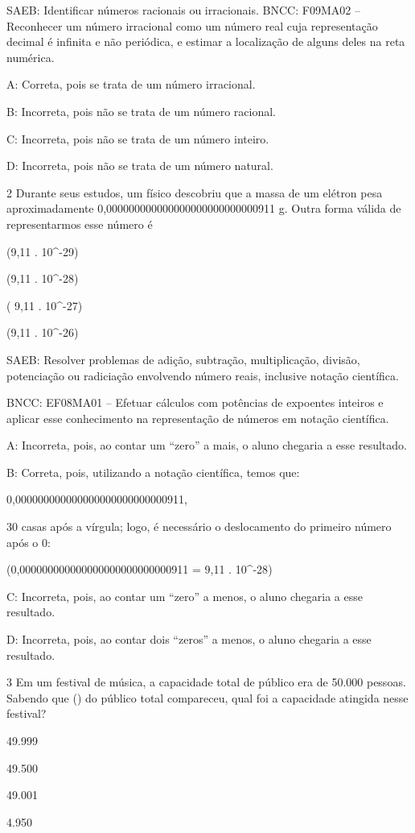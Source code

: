 {SAEB: Identificar números racionais ou irracionais. BNCC: F09MA02 --
Reconhecer um número irracional como um número real cuja representação
decimal é infinita e não periódica, e estimar a localização de alguns
deles na reta numérica.

A: Correta, pois se trata de um número irracional.

B: Incorreta, pois não se trata de um número racional.

C: Incorreta, pois não se trata de um número inteiro.

D: Incorreta, pois não se trata de um número natural.

\num{2} Durante seus estudos, um físico descobriu que a massa de um elétron
pesa aproximadamente 0,000000000000000000000000000911 g. Outra forma
válida de representarmos esse número é
\item (9,11 . 10^{-29})
\item (9,11 . 10^{-28})
\item ( 9,11 . 10^{-27})
\item (9,11 . 10^{-26})

SAEB: Resolver problemas de adição, subtração, multiplicação, divisão,
potenciação ou radiciação envolvendo número reais, inclusive notação
científica.

BNCC: EF08MA01 -- Efetuar cálculos com potências de expoentes inteiros e
aplicar esse conhecimento na representação de números em notação
científica.

A: Incorreta, pois, ao contar um ``zero'' a mais, o aluno chegaria a
esse resultado.

B: Correta, pois, utilizando a notação científica, temos que:

0,000000000000000000000000000911,

30 casas após a vírgula; logo, é necessário o deslocamento do primeiro
número após o 0:

(0,000000000000000000000000000911 = 9,11 . 10^{-28})

C: Incorreta, pois, ao contar um ``zero'' a menos, o aluno chegaria a
esse resultado.

D: Incorreta, pois, ao contar dois ``zeros'' a menos, o aluno chegaria a
esse resultado.

\num{3} Em um festival de música, a capacidade total de público era de 50.000
pessoas. Sabendo que () do público total compareceu,
qual foi a capacidade atingida nesse festival?
\item 49.999
\item 49.500
\item 49.001
\item 4.950

}
